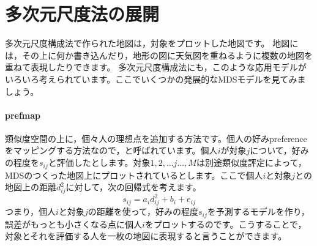 \documentclass{ltjsbook}
\begin{document}
\section{多次元尺度法の展開}
多次元尺度構成法で作られた地図は，対象をプロットした地図です。
地図には，その上に何か書き込んだり，地形の図に天気図を重ねるように複数の地図を重ねて表現したりできます。
多次元尺度構成法にも，このような応用モデルがいろいろ考えられています。ここでいくつかの発展的なMDSモデルを見てみましょう。

\paragraph{prefmap}類似度空間の上に，個々人の理想点を追加する方法です。個人の好みpreferenceをマッピングする方法なので，と呼ばれています。個人$i$が対象$j$について，好みの程度を$s_{ij}$と評価したとします。対象$1,2,...j...,M$は別途類似度評定によって，MDSのつくった地図上にプロットされているとします。ここで個人$i$と対象$j$との地図上の距離$d_{ij}^2$に対して，次の回帰式を考えます。
\[ s_{ij} = a_i d_{ij}^2 + b_i + e_{ij} \]
つまり，個人$i$と対象$j$の距離を使って，好みの程度$s_{ij}$を予測するモデルを作り，誤差がもっとも小さくなる点に個人$i$をプロットするのです。こうすることで，対象とそれを評価する人を一枚の地図に表現すると言うことができます。
\end{document}
